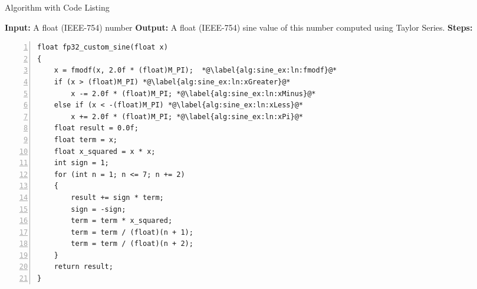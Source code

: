 
\begin{algorithm}
    \caption{Algorithm with Code Listing}
    \begin{algorithmic}[1]
    \State \textbf{Input:} A float (IEEE-754) number
    \State \textbf{Output:} A float (IEEE-754) sine value of this number computed using Taylor Series.
    \State \textbf{Steps:}
\begin{lstlisting}[numbers=left]
float fp32_custom_sine(float x)
{
    x = fmodf(x, 2.0f * (float)M_PI);  *@\label{alg:sine_ex:ln:fmodf}@*
    if (x > (float)M_PI) *@\label{alg:sine_ex:ln:xGreater}@*
        x -= 2.0f * (float)M_PI; *@\label{alg:sine_ex:ln:xMinus}@*
    else if (x < -(float)M_PI) *@\label{alg:sine_ex:ln:xLess}@*
        x += 2.0f * (float)M_PI; *@\label{alg:sine_ex:ln:xPi}@*
    float result = 0.0f;
    float term = x;
    float x_squared = x * x;
    int sign = 1;
    for (int n = 1; n <= 7; n += 2)
    {
        result += sign * term;
        sign = -sign;
        term = term * x_squared;
        term = term / (float)(n + 1);
        term = term / (float)(n + 2);
    }
    return result;
}

\end{lstlisting}
\end{algorithmic}
 \label{alg:sine_existing}
\end{algorithm}